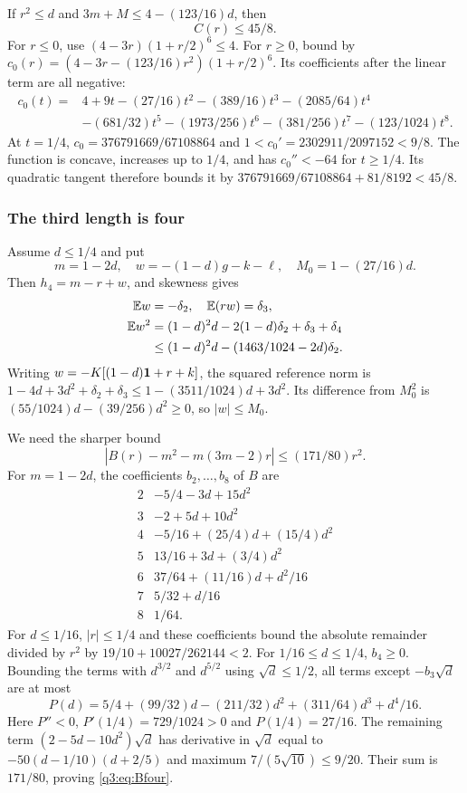 If $r^2\le d$ and $3m+M\le4-(123/16)d$, then
\begin{equation}\label{q3:eq:Cuniform}
 C(r)\le45/8.
\end{equation}
For $r\le0$, use $(4-3r)(1+r/2)^6\le4$. For $r\ge0$, bound by
$c_0(r)=(4-3r-(123/16)r^2)(1+r/2)^6$.
Its coefficients after the linear term are all negative:
\[
\begin{split}
 c_0(t)={}&4+9t-(27/16)t^2-(389/16)t^3-(2085/64)t^4\\
 &-(681/32)t^5-(1973/256)t^6-(381/256)t^7-(123/1024)t^8 .
\end{split}
\]
At $t=1/4$, $c_0=376791669/67108864$ and $1<c_0'=2302911/2097152<9/8$.
The function is concave, increases up to $1/4$, and has $c_0''<-64$ for $t\ge1/4$. Its quadratic tangent therefore bounds it by
$376791669/67108864+81/8192<45/8$.

\subsubsection{The third length is four}
Assume $d\le1/4$ and put
\[
 m=1-2d,\quad w=-(1-d)g-k-\ell,\quad M_0=1-(27/16)d.
\]
Then $h_4=m-r+w$, and skewness gives
\[
 \begin{aligned}
 \mathbb E w&=-\delta_{2},\quad \mathbb E(rw)=\delta_{3},\\
 \mathbb E w^2&=(1-d)^2d-2(1-d)\delta_{2}+\delta_{3}+\delta_{4}\\
 &\le(1-d)^2d-(1463/1024-2d)\delta_{2} .
 \end{aligned}
\]
Writing $w=-K[(1-d)\mathbf1+r+k]$, the squared reference norm is
$1-4d+3d^2+\delta_{2}+\delta_{3}\le1-(3511/1024)d+3d^2$.
Its difference from $M_0^2$ is $(55/1024)d-(39/256)d^2\ge0$, so $|w|\le M_0$.

We need the sharper bound
\begin{equation}\label{q3:eq:Bfour}
 |B(r)-m^2-m(3m-2)r|\le(171/80)r^2 .
\end{equation}
For $m=1-2d$, the coefficients $b_2,\ldots,b_8$ of $B$ are
\[
\begin{array}{c|l}
2&-5/4-3d+15d^2\\3&-2+5d+10d^2\\
4&-5/16+(25/4)d+(15/4)d^2\\
5&13/16+3d+(3/4)d^2\\6&37/64+(11/16)d+d^2/16\\
7&5/32+d/16\\8&1/64 .
\end{array}
\]
For $d\le1/16$, $|r|\le1/4$ and these coefficients bound the absolute remainder divided by $r^2$ by $19/10+10027/262144<2$.
For $1/16\le d\le1/4$, $b_4\ge0$. Bounding the terms with $d^{3/2}$ and $d^{5/2}$ using $\sqrt d\le1/2$, all terms except $-b_3\sqrt d$ are at most
\[
 P(d)=5/4+(99/32)d-(211/32)d^2+(311/64)d^3+d^4/16.
\]
Here $P''<0$, $P'(1/4)=729/1024>0$ and $P(1/4)=27/16$.
The remaining term $(2-5d-10d^2)\sqrt d$ has derivative in $\sqrt d$ equal to $-50(d-1/10)(d+2/5)$ and maximum $7/(5\sqrt{10})\le9/20$. Their sum is $171/80$, proving \eqref{q3:eq:Bfour}.

